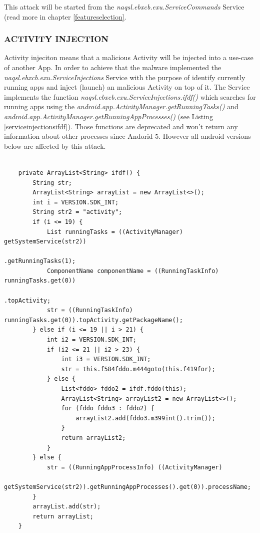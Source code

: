 \documentclass[10pt,titlepage]{article}
\begin{document}
This attack will be started from the \textit{naqsl.ebxcb.exu.ServiceCommands} Service (read more in chapter \ref{featureselection}.

\newpage
\subsubsection{ACTIVITY INJECTION} \label{activityinjection}
Activity injeciton means that a malicious Activity will be injected into a use-case of another App. In order to achieve that the malware implemented the \textit{naqsl.ebxcb.exu.ServiceInjections} Service with the purpose of identify currently running apps and inject (launch) an malicious Activity on top of it. The Service implements the function \textit{naqsl.ebxcb.exu.ServiceInjections.ifdf()} which searches for running apps using the \textit{android.app.ActivityManager.getRunningTasks()} \cite[/reference/android/app/ActivityManager\#getRunningTasks(int)]{AndroidDev} and \textit{android.app.ActivityManager.getRunningAppProcesses()} \cite[/reference/android/app/ActivityManager\#getRunningAppProcesses()]{AndroidDev} (see Listing \ref{serviceinjectionsifdf}). Those functions are deprecated and won't return any information about other processes since Andorid 5. However all android versions below are affected by this attack.

\begin{lstlisting}[label=serviceinjectionsifdf,caption=The function \textit{naqsl.ebxcb.exu.ServiceInjections.ifdf()} searches for running Apps using the API functions \textit{android.app.ActivityManager.getRunningTasks()} \cite{AndroidDev} and \textit{android.app.ActivityManager.getRunningAppProcesses()} \cite{AndroidDev} which are deprecated since Android 5.,frame=tb]

    private ArrayList<String> ifdf() {
        String str;
        ArrayList<String> arrayList = new ArrayList<>();
        int i = VERSION.SDK_INT;
        String str2 = "activity";
        if (i <= 19) {
            List runningTasks = ((ActivityManager) getSystemService(str2))
                                                     .getRunningTasks(1);
            ComponentName componentName = ((RunningTaskInfo) runningTasks.get(0))
                                                                        .topActivity;
            str = ((RunningTaskInfo) runningTasks.get(0)).topActivity.getPackageName();
        } else if (i <= 19 || i > 21) {
            int i2 = VERSION.SDK_INT;
            if (i2 <= 21 || i2 > 23) {
                int i3 = VERSION.SDK_INT;
                str = this.f584fddo.m444goto(this.f419for);
            } else {
                List<fddo> fddo2 = ifdf.fddo(this);
                ArrayList<String> arrayList2 = new ArrayList<>();
                for (fddo fddo3 : fddo2) {
                    arrayList2.add(fddo3.m399int().trim());
                }
                return arrayList2;
            }
        } else {
            str = ((RunningAppProcessInfo) ((ActivityManager)
                   getSystemService(str2)).getRunningAppProcesses().get(0)).processName;
        }
        arrayList.add(str);
        return arrayList;
    }
\end{lstlisting}
\end{document}
